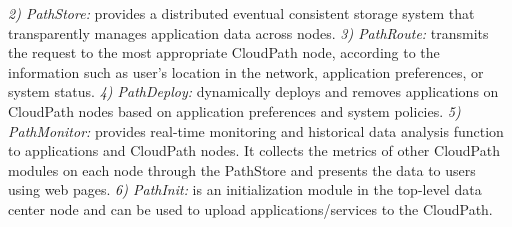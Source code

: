 \textit{2) PathStore:} provides a distributed eventual consistent storage system that transparently manages application data across nodes. 
\textit{3) PathRoute:} transmits the request to the most appropriate CloudPath node, according to the information such as user's location in the network, application preferences, or system status.
\textit{4) PathDeploy:} dynamically deploys and removes applications on CloudPath nodes based on application preferences and system policies.
\textit{5) PathMonitor:} provides real-time monitoring and historical data analysis function to applications and CloudPath nodes. It collects the metrics of other CloudPath modules on each node through the PathStore and presents the data to users using web pages.
\textit{6) PathInit:} is an initialization module in the top-level data center node and can be used to upload applications/services to the CloudPath.

